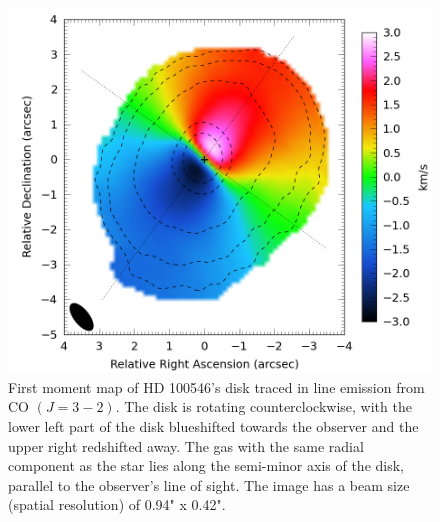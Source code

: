 \documentclass{knac}
\begin{document}
\begin{figure}
  \label{fig:moment}
  \centering
  \includegraphics[width=12 cm]{moment0.png}
  \caption{First moment map of HD 100546's disk traced in line emission from CO $(J=3-2)$. The disk is rotating counterclockwise, with the lower left part of the disk blueshifted towards the observer and the upper right redshifted away. The gas with the same radial component as the star lies along the semi-minor axis of the disk, parallel to the observer's line of sight. The image has a beam size (spatial resolution) of 0.94" x 0.42".}
\end{figure}
\end{document}
